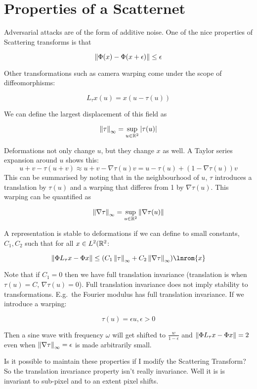 \def \path {misc/scat_new}
\def \imgpath {\path/images}

\section{Properties of a Scatternet}
Adversarial attacks are of the form of additive noise. One of the nice properties of Scattering
transforms is that 

$$ \norm{ \Phi(x) - \Phi(x+\epsilon) } \leq \epsilon$$

Other transformations such as camera warping come under the scope of diffeomorphisms:

$$L_{\tau} x(u) = x(u-\tau(u))$$

We can define the largest displacement of this field as 

$$\norm{\tau}_{\infty} = \sup_{u \in \reals[2]} |\tau(u)|$$

Deformations not only change $u$, but they change $x$ as well. A Taylor series
expansion around $u$ shows this: $$u+v - \tau(u+v) \approx u + v - \nabla
\tau(u)v = u - \tau(u) + (1-\nabla\tau(u))v$$ This can be summarised by noting
that in the neighbourhood of $u$, $\tau$ introduces a translation by $\tau(u)$
and a warping that differes from 1 by $\nabla \tau(u)$. This warping can be
quantified as 

$$\norm{\nabla \tau}_{\infty} = \sup_{u\in \reals[2]} \norm{\nabla \tau(u)}$$

A representation is stable to deformations if we can define to small constants,
$C_1, C_2$ such that for all $x\in L^2(\reals[2]$:

$$ \norm{ \Phi L_\tau x - \Phi x } \leq (C_1 \norm{\tau}_\infty + C_2 \norm{ \nabla \tau }_\infty) \lnrom{x}$$

Note that if $C_1 =0$ then we have full translation invariance (translation is
when $\tau(u) = C$, $\nabla \tau(u) = 0$). Full translation invariance does not
imply stability to transformations.  E.g.\ the Fourier modulus has full
translation invariance. If we introduce a warping:

$$\tau(u) = \epsilon u, \epsilon > 0$$

Then a sine wave with frequency $\omega$ will get shifted to
$\frac{w}{1-\epsilon}$ and $\norm{\Phi L_\tau x - \Phi x } = 2$ even when
$\norm{\nabla \tau}_\infty = \epsilon$ is made arbitrarily small.

Is it possible to maintain these properties if I modify the Scattering
Transform? So the translation invariance property isn't really invariance. Well
it is is invariant to sub-pixel and to an extent pixel shifts.

